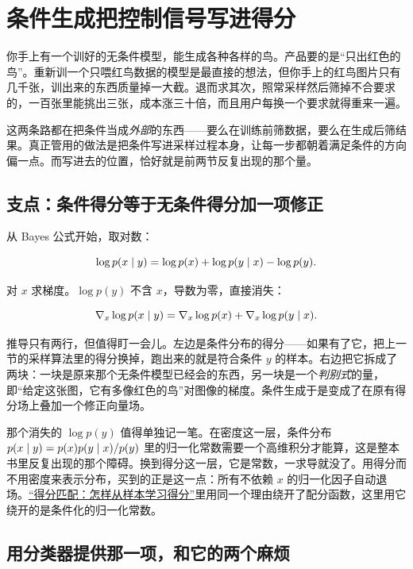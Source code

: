 \section{条件生成把控制信号写进得分}
\label{sec:14-Deep-Learning/08-Diffusion-Models/04}

你手上有一个训好的无条件模型，能生成各种各样的鸟。产品要的是``只出红色的鸟''。重新训一个只喂红鸟数据的模型是最直接的想法，但你手上的红鸟图片只有几千张，训出来的东西质量掉一大截。退而求其次，照常采样然后筛掉不合要求的，一百张里能挑出三张，成本涨三十倍，而且用户每换一个要求就得重来一遍。

这两条路都在把条件当成\emph{外部}的东西——要么在训练前筛数据，要么在生成后筛结果。真正管用的做法是把条件写进采样过程本身，让每一步都朝着满足条件的方向偏一点。而写进去的位置，恰好就是前两节反复出现的那个量。

\subsection{支点：条件得分等于无条件得分加一项修正}

从 Bayes 公式开始，取对数：

\[
\log p(x\mid y)=\log p(x)+\log p(y\mid x)-\log p(y).
\]

对 \(x\) 求梯度。\(\log p(y)\) 不含 \(x\)，导数为零，直接消失：

\[
\nabla_x\log p(x\mid y)=\nabla_x\log p(x)+\nabla_x\log p(y\mid x).
\]

推导只有两行，但值得盯一会儿。左边是条件分布的得分——如果有了它，把上一节的采样算法里的得分换掉，跑出来的就是符合条件 \(y\) 的样本。右边把它拆成了两块：一块是原来那个无条件模型已经会的东西，另一块是一个\emph{判别式}的量，即``给定这张图，它有多像红色的鸟''对图像的梯度。条件生成于是变成了在原有得分场上叠加一个修正向量场。

那个消失的 \(\log p(y)\) 值得单独记一笔。在密度这一层，条件分布 \(p(x\mid y)=p(x)p(y\mid x)/p(y)\) 里的归一化常数需要一个高维积分才能算，这是整本书里反复出现的那个障碍。换到得分这一层，它是常数，一求导就没了。用得分而不用密度来表示分布，买到的正是这一点：所有不依赖 \(x\) 的归一化因子自动退场。\hyperref[sec:06-Random-Processes/06-Diffusion-and-SDE/05]{``得分匹配：怎样从样本学习得分''}里用同一个理由绕开了配分函数，这里用它绕开的是条件化的归一化常数。

\subsection{用分类器提供那一项，和它的两个麻烦}

